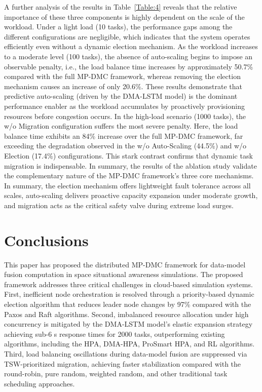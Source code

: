 \documentclass[twoside,twocolumn]{article}
\begin{document}
A further analysis of the results in Table~\ref{Table:4} reveals that the relative importance of these three components is highly dependent on the scale of the workload. Under a light load (10 tasks), the performance gaps among the different configurations are negligible, which indicates that the system operates efficiently even without a dynamic election mechanism. As the workload increases to a moderate level (100 tasks), the absence of auto-scaling begins to impose an observable penalty, i.e., the load balance time increases by approximately 50.7\% compared with the full MP-DMC framework, whereas removing the election mechanism causes an increase of only 20.6\%. These results demonstrate that predictive auto-scaling (driven by the DMA-LSTM model) is the dominant performance enabler as the workload accumulates by proactively provisioning resources before congestion occurs. In the high-load scenario (1000 tasks), the w/o Migration configuration suffers the most severe penalty. Here, the load balance time exhibits an 84\% increase over the full MP-DMC framework, far exceeding the degradation observed in the w/o Auto-Scaling (44.5\%) and w/o Election (17.4\%) configurations. This stark contrast confirms that dynamic task migration is indispensable. In summary, the results of the ablation study validate the complementary nature of the MP-DMC framework's three core mechanisms. In summary, the election mechanism offers lightweight fault tolerance across all scales, auto-scaling delivers proactive capacity expansion under moderate growth, and migration acts as the critical safety valve during extreme load surges.

\section{Conclusions}

This paper has proposed the distributed MP-DMC framework for data-model fusion computation in space situational awareness simulations. The proposed framework addresses three critical challenges in cloud-based simulation systems. First, inefficient node orchestration is resolved through a priority-based dynamic election algorithm that reduces leader node changes by 97\% compared with the Paxos and Raft algorithms. Second, imbalanced resource allocation under high concurrency is mitigated by the DMA-LSTM model's elastic expansion strategy achieving sub-6 s response times for 2000 tasks, outperforming existing algorithms, including the HPA, DMA-HPA, ProSmart HPA, and RL algorithms. Third, load balancing oscillations during data-model fusion are suppressed via TSW-prioritized migration, achieving faster stabilization compared with the round-robin, pure random, weighted random, and other traditional task scheduling approaches.
\end{document}
